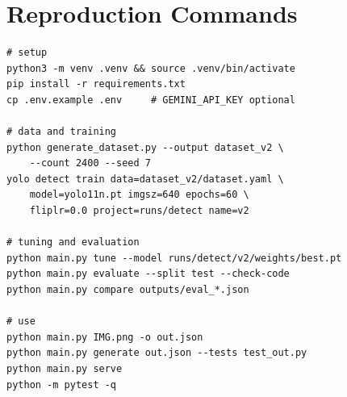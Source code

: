 \documentclass[journal,10pt]{IEEEtran}
\begin{document}
\section{Reproduction Commands}
{\footnotesize
\begin{verbatim}
# setup
python3 -m venv .venv && source .venv/bin/activate
pip install -r requirements.txt
cp .env.example .env     # GEMINI_API_KEY optional

# data and training
python generate_dataset.py --output dataset_v2 \
    --count 2400 --seed 7
yolo detect train data=dataset_v2/dataset.yaml \
    model=yolo11n.pt imgsz=640 epochs=60 \
    fliplr=0.0 project=runs/detect name=v2

# tuning and evaluation
python main.py tune --model runs/detect/v2/weights/best.pt
python main.py evaluate --split test --check-code
python main.py compare outputs/eval_*.json

# use
python main.py IMG.png -o out.json
python main.py generate out.json --tests test_out.py
python main.py serve
python -m pytest -q
\end{verbatim}
}
\end{document}
